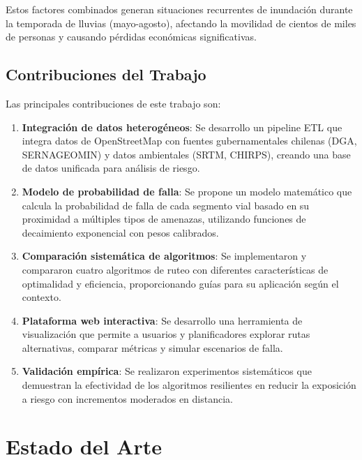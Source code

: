 \documentclass[conference]{IEEEtran}
\begin{document}
Estos factores combinados generan situaciones recurrentes de inundación durante la temporada de lluvias (mayo-agosto), afectando la movilidad de cientos de miles de personas y causando pérdidas económicas significativas.

\subsection{Contribuciones del Trabajo}

Las principales contribuciones de este trabajo son:

\begin{enumerate}
    \item \textbf{Integración de datos heterogéneos}: Se desarrollo un pipeline ETL que integra datos de OpenStreetMap con fuentes gubernamentales chilenas (DGA, SERNAGEOMIN) y datos ambientales (SRTM, CHIRPS), creando una base de datos unificada para análisis de riesgo.

    \item \textbf{Modelo de probabilidad de falla}: Se propone un modelo matemático que calcula la probabilidad de falla de cada segmento vial basado en su proximidad a múltiples tipos de amenazas, utilizando funciones de decaimiento exponencial con pesos calibrados.

    \item \textbf{Comparación sistemática de algoritmos}: Se implementaron y compararon cuatro algoritmos de ruteo con diferentes características de optimalidad y eficiencia, proporcionando guías para su aplicación según el contexto.

    \item \textbf{Plataforma web interactiva}: Se desarrollo una herramienta de visualización que permite a usuarios y planificadores explorar rutas alternativas, comparar métricas y simular escenarios de falla.

    \item \textbf{Validación empírica}: Se realizaron experimentos sistemáticos que demuestran la efectividad de los algoritmos resilientes en reducir la exposición a riesgo con incrementos moderados en distancia.
\end{enumerate}

\section{Estado del Arte}
\end{document}
